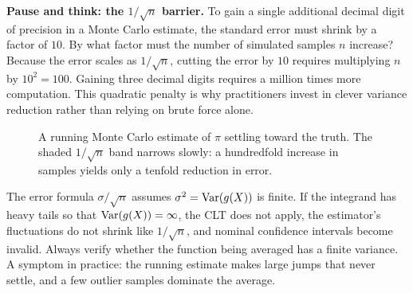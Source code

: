\begin{recoverybox}
\textbf{Pause and think: the $1/\sqrt{n}$ barrier.}
To gain a single additional decimal digit of precision in a Monte Carlo estimate, the standard error must shrink by a factor of $10$. By what factor must the number of simulated samples $n$ increase?
Because the error scales as $1/\sqrt{n}$, cutting the error by $10$ requires multiplying $n$ by $10^2 = 100$. Gaining three decimal digits requires a million times more computation. This quadratic penalty is why practitioners invest in clever variance reduction rather than relying on brute force alone.
\end{recoverybox}
\begin{figure}[H]
\centering
{}
\caption{A running Monte Carlo estimate of $\pi$ settling toward the truth. The
shaded $1/\sqrt n$ band narrows slowly: a hundredfold increase in
samples yields only a tenfold reduction in error.}
\label{ch35:fig-convergence}
\end{figure}
\begin{trapbox}
The error formula $\sigma/\sqrt n$ assumes $\sigma^2 = \operatorname{Var}(g(X))$ is finite. If
the integrand has heavy tails so that $\operatorname{Var}(g(X)) = \infty$, the CLT does not
apply, the estimator's fluctuations do not shrink like $1/\sqrt n$, and nominal
confidence intervals become invalid. Always verify whether the function being
averaged has a finite variance. A symptom in practice: the running estimate makes large
jumps that never settle, and a few outlier samples dominate the average.
\end{trapbox}
